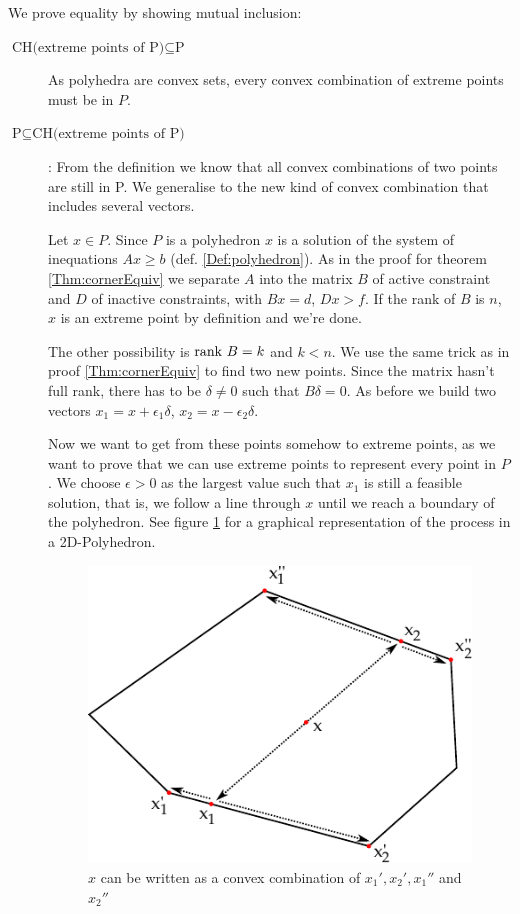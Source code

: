 \begin{pr} We prove equality by showing mutual inclusion:
\begin{description}
\item[$\text{CH(extreme points of P)} \subseteq \text{P}$] As polyhedra are convex sets, every convex combination of extreme points must be in $P$.
\item[$\text{P} \subseteq \text{CH(extreme points of P)}$]:  From the definition we know that all convex combinations of two points are still in P. We generalise to the new kind of convex combination that includes several vectors. 

Let $x\in P$. Since $P$ is a polyhedron $x$ is a solution of the system of inequations $Ax\geq b$ (def. \ref{Def:polyhedron}). As in the proof for theorem \ref{Thm:cornerEquiv} we separate $A$ into the matrix $B$ of active constraint and $D$ of inactive constraints, with $Bx=d$, $Dx>f$. If the rank of $B$ is $n$, $x$ is an extreme point by definition and we're done. 

The other possibility is $\mbox{rank } B=k$ and $k<n$. We use the same trick as in proof \ref{Thm:cornerEquiv} to find two new points. Since the matrix hasn't full rank, there has to be $\delta \neq 0$ such that $B\delta = 0$. As before we build two vectors $x_1 = x+ \epsilon_1 \delta$, $x_2=x-\epsilon_2 \delta$. 

Now we want to get from these points somehow to extreme points, as we want to prove that we can use extreme points to represent every point in $P$. We choose $\epsilon>0$ as the largest value such that $x_1$ is still a feasible solution, that is, we follow a line through $x$ until we reach a boundary of the polyhedron. See figure \ref{Fig:convCombExPoints} for a graphical representation of the process in a 2D-Polyhedron.

\begin{figure}[hbt]
\begin{center}
\includegraphics{./images/convex_comb_extr_points.pdf}
\end{center}
\caption{$x$ can be written as a convex combination of $x_1',x_2', x_1''$ and $x_2''$}
\label{Fig:convCombExPoints}
\end{figure}


\end{description}
\end{pr}
